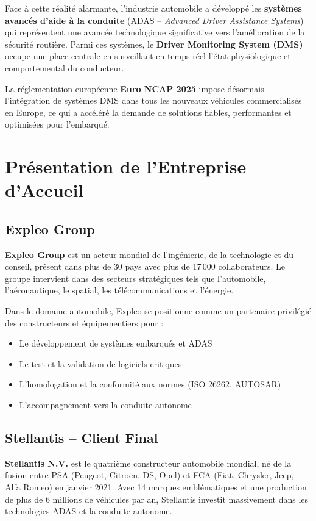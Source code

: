 \documentclass[12pt,a4paper,twoside]{report}
\newcommand{\keyword}[1]{\textbf{\textcolor{stellantisblue}{#1}}}
\begin{document}
Face à cette réalité alarmante, l'industrie automobile a développé les \keyword{systèmes avancés d'aide à la conduite} (ADAS -- \textit{Advanced Driver Assistance Systems}) qui représentent une avancée technologique significative vers l'amélioration de la sécurité routière. Parmi ces systèmes, le \keyword{Driver Monitoring System (DMS)} occupe une place centrale en surveillant en temps réel l'état physiologique et comportemental du conducteur.

La réglementation européenne \textbf{Euro NCAP 2025} \cite{euroncap2023} impose désormais l'intégration de systèmes DMS dans tous les nouveaux véhicules commercialisés en Europe, ce qui a accéléré la demande de solutions fiables, performantes et optimisées pour l'embarqué.

\section{Présentation de l'Entreprise d'Accueil}

\subsection{Expleo Group}

\keyword{Expleo Group} est un acteur mondial de l'ingénierie, de la technologie et du conseil, présent dans plus de 30 pays avec plus de 17\,000 collaborateurs. Le groupe intervient dans des secteurs stratégiques tels que l'automobile, l'aéronautique, le spatial, les télécommunications et l'énergie.

Dans le domaine automobile, Expleo se positionne comme un partenaire privilégié des constructeurs et équipementiers pour :
\begin{itemize}[leftmargin=2cm]
    \item Le développement de systèmes embarqués et ADAS
    \item Le test et la validation de logiciels critiques
    \item L'homologation et la conformité aux normes (ISO 26262, AUTOSAR)
    \item L'accompagnement vers la conduite autonome
\end{itemize}

\subsection{Stellantis -- Client Final}

\keyword{Stellantis N.V.} est le quatrième constructeur automobile mondial, né de la fusion entre PSA (Peugeot, Citroën, DS, Opel) et FCA (Fiat, Chrysler, Jeep, Alfa Romeo) en janvier 2021. Avec 14 marques emblématiques et une production de plus de 6 millions de véhicules par an, Stellantis investit massivement dans les technologies ADAS et la conduite autonome.
\end{document}
